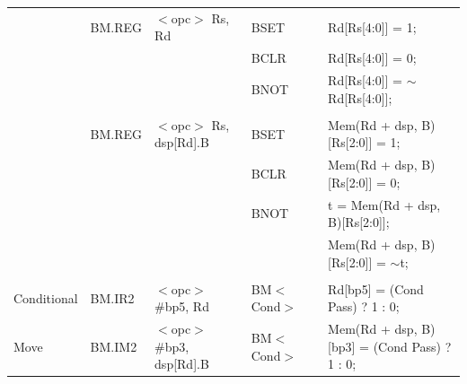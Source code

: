 \begin{table}
\begin{subtable}{\linewidth}
\begin{center}
\begin{tabular}{llllll}
                   & BM.REG            & $<$opc$>$ Rs, Rd                      & BSET              & \flags{----}      & Rd[Rs[4:0]] = 1;                                                              \\
                   &                   &                                       & BCLR              & \flags{----}      & Rd[Rs[4:0]] = 0;                                                              \\
                   &                   &                                       & BNOT              & \flags{----}      & Rd[Rs[4:0]] = $\sim$Rd[Rs[4:0]];                                              \\
                   &                   &                                       &                   &                   &                                                                               \\
                   & BM.REG            & $<$opc$>$ Rs, dsp[Rd].B               & BSET              & \flags{----}      & Mem(Rd + dsp, B)[Rs[2:0]] = 1;                                                \\
                   &                   &                                       & BCLR              & \flags{----}      & Mem(Rd + dsp, B)[Rs[2:0]] = 0;                                                \\
                   &                   &                                       & BNOT              & \flags{----}      & t = Mem(Rd + dsp, B)[Rs[2:0]];                                                \\
                   &                   &                                       &                   &                   & Mem(Rd + dsp, B)[Rs[2:0]] = $\sim$t;                                          \\
                   &                   &                                       &                   &                   &                                                                               \\
Conditional        & BM.IR2            & $<$opc$>$ \#bp5, Rd                   & BM$<$Cond$>$      & \flags{----}      & Rd[bp5] = (Cond Pass) ? 1 : 0;                                                \\
Move               & BM.IM2            & $<$opc$>$ \#bp3, dsp[Rd].B            & BM$<$Cond$>$      & \flags{----}      & Mem(Rd + dsp, B)[bp3] = (Cond Pass) ? 1 : 0;                                  \\

\end{tabular}
\end{center}
\end{subtable}
\end{table}

